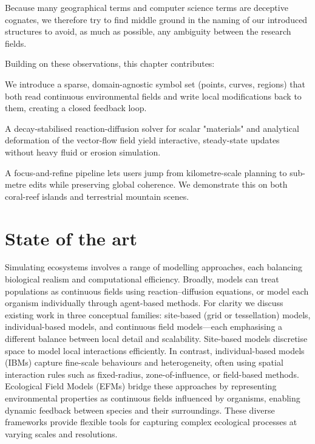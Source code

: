 Because many geographical terms and computer science terms are deceptive cognates, we therefore try to find middle ground in the naming of our introduced structures to avoid, as much as possible, any ambiguity between the research fields. 

Building on these observations, this chapter contributes:  
\begin{Itemize}
     We introduce a sparse, domain-agnostic symbol set (points, curves, regions) that both read continuous environmental fields and write local modifications back to them, creating a closed feedback loop.

     A decay-stabilised reaction-diffusion solver for scalar "materials" and analytical deformation of the vector-flow field yield interactive, steady-state updates without heavy fluid or erosion simulation.

     A focus-and-refine pipeline lets users jump from kilometre-scale planning to sub-metre edits while preserving global coherence. We demonstrate this on both coral-reef islands and terrestrial mountain scenes.
\end{Itemize}












\section{State of the art}
\label{sec:env-obj_related-works}

Simulating ecosystems involves a range of modelling approaches, each balancing biological realism and computational efficiency. Broadly, models can treat populations as continuous fields using reaction--diffusion equations, or model each organism individually through agent-based methods. For clarity we discuss existing work in three conceptual families: site-based (grid or tessellation) models, individual-based models, and continuous field models—each emphasising a different balance between local detail and scalability. Site-based models discretise space to model local interactions efficiently. In contrast, individual-based models (IBMs) capture fine-scale behaviours and heterogeneity, often using spatial interaction rules such as fixed-radius, zone-of-influence, or field-based methods. Ecological Field Models (EFMs) bridge these approaches by representing environmental properties as continuous fields influenced by organisms, enabling dynamic feedback between species and their surroundings. These diverse frameworks provide flexible tools for capturing complex ecological processes at varying scales and resolutions.

